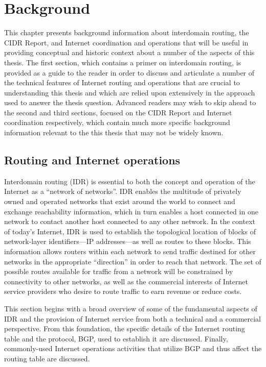 \chapter{Background}
\label{chap:background}

This chapter presents background information about interdomain routing, the
CIDR Report, and Internet coordination and operations that will be useful in
providing conceptual and historic context about a number of the aspects of this
thesis. The first section, which contains a primer on interdomain routing, is
provided as a guide to the reader in order to discuss and articulate a number
of the technical features of Internet routing and operations that are crucial
to understanding this thesis and which are relied upon extensively in the
approach used to answer the thesis question. Advanced readers may wish to skip
ahead to the second and third sections, focused on the CIDR Report and Internet
coordination respectively, which contain much more specific background
information relevant to the this thesis that may not be widely known.

\section{Routing and Internet operations}

Interdomain routing (IDR) is essential to both the concept and operation of the
Internet as a ``network of networks''. IDR enables the multitude of privately
owned and operated networks that exist around the world to connect and exchange
reachability information, which in turn enables a host connected in one network
to contact another host connected to any other network. In the context of
today's Internet, IDR is used to establish the topological location of blocks
of network-layer identifiers---IP addresses---as well as routes to these
blocks. This information allows routers within each network to send traffic
destined for other networks in the appropriate ``direction'' in order to reach
that network. The set of possible routes available for traffic from a network
will be constrained by connectivity to other networks, as well as the
commercial interests of Internet service providers who desire to route traffic
to earn revenue or reduce costs.

This section begins with a broad overview of some of the fundamental aspects of
IDR and the provision of Internet service from both a technical and a
commercial perspective. From this foundation, the specific details of the
Internet routing table and the protocol, BGP, used to establish it are
discussed. Finally, commonly-used Internet operations activities that utilize
BGP and thus affect the routing table are discussed.

